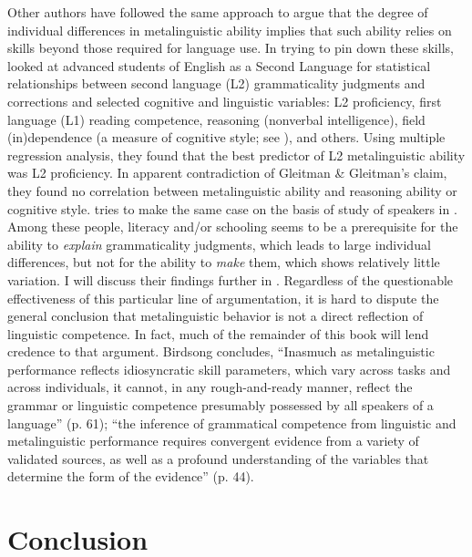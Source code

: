 Other authors have followed the same approach to argue that the degree of individual differences in metalinguistic ability implies that such ability relies on skills beyond those required for language use. In trying to pin down these skills, \citet{MasnyEtAl1985} looked  at advanced students of English  as a Second Language for statistical relationships between second language (L2) grammaticality judgments and corrections and selected cognitive and linguistic variables: L2 proficiency, first language (L1) reading competence, reasoning (nonverbal intelligence), field (in)dependence (a measure of cognitive style; see ), and others. Using multiple regression analysis, they found that the best predictor of L2 metalinguistic ability was L2 proficiency. In apparent contradiction of Gleitman \& Gleitman's claim, they found no correlation between metalinguistic ability and reasoning ability or cognitive style. \citet{Birdsong1989} tries to make the same case on the basis of  study of  speakers in . Among these people, literacy and/or schooling seems to be a prerequisite for the ability to \textit{explain} grammaticality judgments, which leads to large individual differences, but not for the ability to \textit{make} them, which shows relatively little variation. I will discuss their findings further in . Regardless of the questionable effectiveness of this particular line of argumentation,
it is hard to dispute the general conclusion that metalinguistic behavior is not a direct reflection of linguistic competence. In fact, much of the remainder of this book will lend credence to that argument. Birdsong concludes, ``Inasmuch as metalinguistic performance reflects idiosyncratic skill parameters, which vary across tasks and across individuals, it cannot, in any rough-and-ready manner, reflect the grammar or linguistic competence presumably possessed by all speakers of a language'' (p. 61); ``the inference of grammatical competence from linguistic and metalinguistic performance requires convergent evidence from a variety of validated sources, as well as a profound understanding of the variables that determine the form of the evidence'' (p. 44).

\section{Conclusion}\label{sec:3.6}

